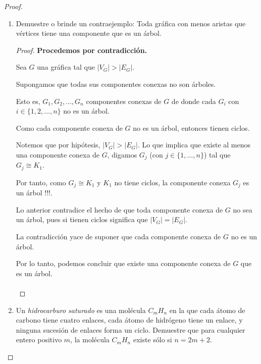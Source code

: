 \documentclass{article}
\begin{document}
\begin{enumerate}
\begin{proof}
\begin{enumerate}
    \item Demuestre o brinde un contraejemplo: Toda
      gr\'afica con menos aristas que v\'ertices tiene
      una componente que es un \'arbol.

      \renewcommand\qedsymbol{QED}
      \begin{proof}
        \textbf{Procedemos por contradicción.}

        Sea $G$ una gráfica tal que $|V_{G}| > |E_{G}|$.

        Supongamos que todas sus componentes conexas no son árboles.

        Esto es, $G_{1}, G_{2}, \dots, G_{n}$ componentes conexas de $G$ de donde
        cada $G_{i}$ con $i \in  \{1, 2, \dots, n\}$ no es un árbol.

        Como cada componente conexa de $G$ no es un árbol, entonces tienen
        ciclos.

        Notemos que por hipótesis, $|V_{G}| > |E_{G}|$. Lo que implica que existe
        al menos una componente conexa de $G$, digamos $G_{j}$ (con
        $j \in \{1, \dots, n\}$) tal que $G_{j} \cong K_{1}$.

        Por tanto, como $G_{j} \cong K_{1}$ y $K_{1}$ no tiene ciclos, la componente
        conexa $G_{j}$ es un árbol !!!.

        Lo anterior contradice el hecho de que toda componente conexa de $G$ no
        sea un árbol, pues si tienen ciclos significa que $|V_{G}| = |E_{G}|$.

        La contradicción yace de suponer que cada componente conexa de $G$ no es un
        árbol.

        Por lo tanto, podemos concluir que existe una componente conexa de $G$ que
        es un árbol. \\
        \\
      \end{proof}

    \item Un {\em hidrocarburo saturado} es una
      mol\'ecula $C_mH_n$ en la que cada \'atomo de
      carbono tiene cuatro enlaces, cada
      \'atomo de hidr\'ogeno tiene un enlace, y
      ninguna sucesi\'on de enlaces forma un ciclo.
      Demuestre que para cualquier entero positivo
      $m$, la mol\'ecula $C_mH_n$ existe s\'olo si
      $n = 2m + 2$.


\end{enumerate}
\end{proof}
\end{enumerate}
\end{document}
